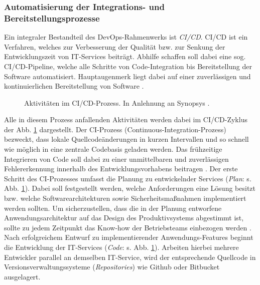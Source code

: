 \subsubsection{Automatisierung der Integrations- und Bereitstellungsprozesse}
\label{sec:CICD}
 Ein integraler Bestandteil des DevOps-Rahmen\-werks ist \textit{\ac{CI/CD}}. CI/CD ist ein Verfahren, welches zur Verbesserung der Qualität bzw. zur Senkung der Entwicklungszeit von IT-Services beiträgt. Abhilfe schaffen soll dabei eine sog. CI/CD-Pipeline, welche alle Schritte von Code-Integration bis Bereitstellung der Software automatisiert. Hauptaugenmerk liegt dabei auf einer zuverlässigen und kontinuierlichen Bereitstellung von Software \cite[471]{Zampetti.92720211012021}.
\begin{center}
	\begin{figure}[H]
		\centering
		\captionsetup{format=myformat}
		\caption[Aktivitäten im CI/CD-Prozess]{Aktivitäten im CI/CD-Prozess. In Anlehnung an Synopsys \cite{.20230201}.}
		\label{fig:CICD_Cycle}
	\end{figure}
\end{center}
\vspace*{-15mm}
Alle in diesem Prozess anfallenden Aktivitäten werden dabei im CI/CD-Zyklus der Abb. \ref{fig:CICD_Cycle} dargestellt. Der \acs{CI}-Prozess (Continuous-Integration-Prozess) bezweckt, dass lokale Quellcode\-änderungen in kurzen Intervallen und so schnell wie möglich in eine zentrale Codebasis geladen werden. Das frühzeitige Integrieren von Code soll dabei zu einer unmittelbaren und zuverlässigen Fehlererkennung innerhalb des Entwicklungsvorhabens beitragen \cite[471]{Zampetti.92720211012021}. 
Der erste Schritt des CI-Prozesses umfasst die Planung zu entwickelnder Services (\textit{Plan}: s. Abb. \ref{fig:CICD_Cycle}). Dabei soll festgestellt werden, welche Anforderungen eine Lösung besitzt bzw. welche Softwarearchitekturen sowie Sicherheitsmaßnahmen implementiert werden sollten. Um sicherzustellen, dass die in der Planung entworfene Anwendungsarchitektur auf das Design des Produktivsystems abgestimmt ist, sollte zu jedem Zeitpunkt das Know-how der Betriebsteams einbezogen werden \cite[16]{Halstenberg.2020}. Nach erfolgreichem Entwurf zu implementierender Anwendungs-Features beginnt die Entwicklung der IT-Services (\textit{Code}: s. Abb. \ref{fig:CICD_Cycle}). Arbeiten hierbei mehrere Entwickler parallel an demselben IT-Service, wird der entsprechende Quellcode in Versionsverwaltungssysteme (\textit{Repositories}) wie Github oder Bitbucket ausgelagert.
